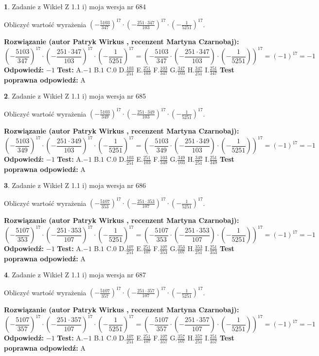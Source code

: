 \documentclass[12pt, a4paper]{article}
\theoremstyle{definition} %
\newtheorem{zad}{}
\newcommand{\zadStart}[1]{\begin{zad}#1\newline}
\newcommand{\zadStop}{\end{zad}}
\newcommand{\rozwStart}[2]{\noindent \textbf{Rozwiązanie (autor #1 , recenzent #2): }\newline}
\newcommand{\rozwStop}{\newline}
\newcommand{\odpStart}{\noindent \textbf{Odpowiedź:}\newline}
\newcommand{\odpStop}{\newline}
\newcommand{\testStart}{\noindent \textbf{Test:}\newline}
\newcommand{\testStop}{\newline}
\newcommand{\kluczStart}{\noindent \textbf{Test poprawna odpowiedź:}\newline}
\newcommand{\kluczStop}{\newline}
\begin{document}
\zadStart{Zadanie z Wikieł Z 1.1 i) moja wersja nr 684}

Obliczyć wartość wyrażenia $(-\frac{5103}{347})^{17} \cdot (-\frac{251 \cdot 347}{103})^{17} \cdot (-\frac{1}{5251})^{17}$.
\zadStop
\rozwStart{Patryk Wirkus}{Martyna Czarnobaj}
$$(-\frac{5103}{347})^{17} \cdot (-\frac{251 \cdot 347}{103})^{17} \cdot (-\frac{1}{5251})^{17} = (-\frac{5103}{347} \cdot (-\frac{251 \cdot 347}{103}) \cdot (-\frac{1}{5251}))^{17} = (-1)^{17} = -1$$
\rozwStop
\odpStart
$-1$
\odpStop
\testStart
A.$-1$ B.$1$ C.$0$ D.$\frac{103}{251}$ E.$\frac{251}{103}$
F.$\frac{103}{347}$ G.$\frac{347}{103}$
H.$\frac{347}{251}$
I.$\frac{251}{347}$
\testStop
\kluczStart
A
\kluczStop



\zadStart{Zadanie z Wikieł Z 1.1 i) moja wersja nr 685}

Obliczyć wartość wyrażenia $(-\frac{5103}{349})^{17} \cdot (-\frac{251 \cdot 349}{103})^{17} \cdot (-\frac{1}{5251})^{17}$.
\zadStop
\rozwStart{Patryk Wirkus}{Martyna Czarnobaj}
$$(-\frac{5103}{349})^{17} \cdot (-\frac{251 \cdot 349}{103})^{17} \cdot (-\frac{1}{5251})^{17} = (-\frac{5103}{349} \cdot (-\frac{251 \cdot 349}{103}) \cdot (-\frac{1}{5251}))^{17} = (-1)^{17} = -1$$
\rozwStop
\odpStart
$-1$
\odpStop
\testStart
A.$-1$ B.$1$ C.$0$ D.$\frac{103}{251}$ E.$\frac{251}{103}$
F.$\frac{103}{349}$ G.$\frac{349}{103}$
H.$\frac{349}{251}$
I.$\frac{251}{349}$
\testStop
\kluczStart
A
\kluczStop



\zadStart{Zadanie z Wikieł Z 1.1 i) moja wersja nr 686}

Obliczyć wartość wyrażenia $(-\frac{5107}{353})^{17} \cdot (-\frac{251 \cdot 353}{107})^{17} \cdot (-\frac{1}{5251})^{17}$.
\zadStop
\rozwStart{Patryk Wirkus}{Martyna Czarnobaj}
$$(-\frac{5107}{353})^{17} \cdot (-\frac{251 \cdot 353}{107})^{17} \cdot (-\frac{1}{5251})^{17} = (-\frac{5107}{353} \cdot (-\frac{251 \cdot 353}{107}) \cdot (-\frac{1}{5251}))^{17} = (-1)^{17} = -1$$
\rozwStop
\odpStart
$-1$
\odpStop
\testStart
A.$-1$ B.$1$ C.$0$ D.$\frac{107}{251}$ E.$\frac{251}{107}$
F.$\frac{107}{353}$ G.$\frac{353}{107}$
H.$\frac{353}{251}$
I.$\frac{251}{353}$
\testStop
\kluczStart
A
\kluczStop



\zadStart{Zadanie z Wikieł Z 1.1 i) moja wersja nr 687}

Obliczyć wartość wyrażenia $(-\frac{5107}{357})^{17} \cdot (-\frac{251 \cdot 357}{107})^{17} \cdot (-\frac{1}{5251})^{17}$.
\zadStop
\rozwStart{Patryk Wirkus}{Martyna Czarnobaj}
$$(-\frac{5107}{357})^{17} \cdot (-\frac{251 \cdot 357}{107})^{17} \cdot (-\frac{1}{5251})^{17} = (-\frac{5107}{357} \cdot (-\frac{251 \cdot 357}{107}) \cdot (-\frac{1}{5251}))^{17} = (-1)^{17} = -1$$
\rozwStop
\odpStart
$-1$
\odpStop
\testStart
A.$-1$ B.$1$ C.$0$ D.$\frac{107}{251}$ E.$\frac{251}{107}$
F.$\frac{107}{357}$ G.$\frac{357}{107}$
H.$\frac{357}{251}$
I.$\frac{251}{357}$
\testStop
\kluczStart
A
\kluczStop
\end{document}
